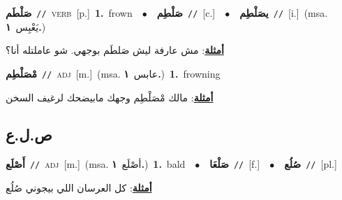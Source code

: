 \documentclass[10pt,a4paper,twoside]{article} %
\begin{document}
\begin{multicols}{2}
{\setlength\topsep{0pt}\textbf{\foreignlanguage{arabic}{صَلْطَم}}\ {\color{gray}\texttt{//}\color{black}}\ \textsc{verb}\ [p.]\ \textbf{1.}~frown\ \ $\bullet$\ \ \setlength\topsep{0pt}\textbf{\foreignlanguage{arabic}{صَلْطِم}}\ {\color{gray}\texttt{//}\color{black}}\ [c.]\ \ $\bullet$\ \ \setlength\topsep{0pt}\textbf{\foreignlanguage{arabic}{يصَلْطِم}}\ {\color{gray}\texttt{//}\color{black}}\ [i.]\ \color{gray}(msa. \foreignlanguage{arabic}{يَعْبِس}~\foreignlanguage{arabic}{\textbf{١.}})\color{black}\  \begin{flushright}\color{gray}\foreignlanguage{arabic}{\textbf{\underline{\foreignlanguage{arabic}{أمثلة}}}: مش عارفة ليش صَلطَم بوجهي. شو عاملتله أنا؟}\end{flushright}\color{black}} \vspace{2mm}

{\setlength\topsep{0pt}\textbf{\foreignlanguage{arabic}{مْصَلْطِم}}\ {\color{gray}\texttt{//}\color{black}}\ \textsc{adj}\ [m.]\ \color{gray}(msa. \foreignlanguage{arabic}{عابس}~\foreignlanguage{arabic}{\textbf{١.}})\color{black}\ \textbf{1.}~frowning\  \begin{flushright}\color{gray}\foreignlanguage{arabic}{\textbf{\underline{\foreignlanguage{arabic}{أمثلة}}}: مالك مْصَلْطِم وجهك مابيضحك لرغيف السخن}\end{flushright}\color{black}} \vspace{2mm}

\vspace{-3mm}
\subsection*{\color{blue}\foreignlanguage{arabic}{ص.ل.ع}\color{blue}{}} 

{\setlength\topsep{0pt}\textbf{\foreignlanguage{arabic}{أَصْلَع}}\ {\color{gray}\texttt{//}\color{black}}\ \textsc{adj}\ [m.]\ \color{gray}(msa. \foreignlanguage{arabic}{أصْلَع}~\foreignlanguage{arabic}{\textbf{١.}})\color{black}\ \textbf{1.}~bald\ \ $\bullet$\ \ \setlength\topsep{0pt}\textbf{\foreignlanguage{arabic}{صَلْعَا}}\ {\color{gray}\texttt{//}\color{black}}\ [f.]\ \ $\bullet$\ \ \setlength\topsep{0pt}\textbf{\foreignlanguage{arabic}{صُلُع}}\ {\color{gray}\texttt{//}\color{black}}\ [pl.]\  \begin{flushright}\color{gray}\foreignlanguage{arabic}{\textbf{\underline{\foreignlanguage{arabic}{أمثلة}}}: كل العرسان اللي بيجوني صُلُع}\end{flushright}\color{black}} \vspace{2mm}


\end{multicols}
\end{document}
